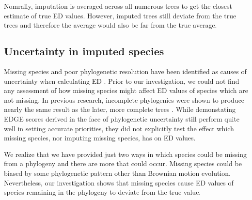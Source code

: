 \documentclass[12pt,english]{article}
\begin{document}
Nomrally, imputation is averaged across all numerous trees to get the closest
estimate of true ED values. However, imputed trees still deviate from the true
trees and therefore the average would also be far from the true average.

\subsection*{Uncertainty in imputed species}
Missing species and poor phylogenetic resolution have been identified as causes
of uncertainty when calculating ED \autocite{Isaac2007}. Prior to our
investigation, we could not find any assessment of how missing species might
affect ED values of species which are not missing. In previous research,
incomplete phylogenies were shown to produce nearly the same result as the
later, more complete trees \autocite{Curnick2015}. While demonstating EDGE
scores derived in the face of phylogenetic uncertainty still perform quite well
in setting accurate priorities, they did not explicitly test the effect which
missing species, nor imputing missing species, has on ED values. 


We realize that we have provided just two ways in which species could be missing
from a phylogeny and there are more that could occur. Missing species could be
biased by some phylogenetic pattern other than Brownian motion evolution.
Nevertheless, our investigation shows that missing species cause ED values of
species remaining in the phylogeny to deviate from the true value.
\end{document}
